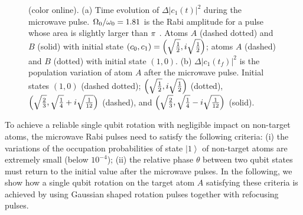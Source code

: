 \documentclass[pra,aps,showpacs,twocolumn]{revtex4}
\begin{document}
\begin{figure}[t]
\begin{center}
\end{center}
\par
\vspace*{-0.0cm}
\caption{(color online). (a) Time evolution of $\Delta |c_{1}(t)|^{2}$
during the microwave pulse. $\Omega _{0}/\protect\omega _{0}=1.81$ is the
Rabi amplitude for a pulse whose area is slightly larger than $\protect\pi $%
. Atoms $A$ (dashed dotted) and $B$ (solid) with initial state $\left(
c_{0},c_{1}\right) =\left( \protect\sqrt{\frac{1}{2}},i\protect\sqrt{\frac{1%
}{2}}\right) $; atoms $A$ (dashed) and $B$ (dotted) with initial state $%
\left( 1,0\right) $. (b) $\Delta |c_{1}(t_{f})|^{2}$ is the population
variation of atom $A$ after the microwave pulse. Initial states $\left(
1,0\right) $ (dashed dotted); $\left( \protect\sqrt{\frac{1}{2}},i\protect%
\sqrt{\frac{1}{2}}\right) $ (dotted), $\left( \protect\sqrt{\frac{2}{3}},%
\protect\sqrt{\frac{1}{4}}+i\protect\sqrt{\frac{1}{12}}\right) $ (dashed),
and $\left( \protect\sqrt{\frac{2}{3}},\protect\sqrt{\frac{1}{4}}-i\protect%
\sqrt{\frac{1}{12}}\right) $ (solid).}
\end{figure}

To achieve a reliable single qubit rotation with negligible impact on
non-target atoms, the microwave Rabi pulses need to satisfy the following
criteria: (i) the variations of the occupation probabilities of state $%
\left\vert 1\right\rangle $ of non-target atoms are extremely small (below $%
10^{-4}$); (ii) the relative phase $\theta $ between two qubit states must
return to the initial value after the microwave pulses. In the following, we
show how a single qubit rotation on the target atom $A$ satisfying these
criteria is achieved by using Gaussian shaped rotation pulses together with
refocusing pulses.
\end{document}
